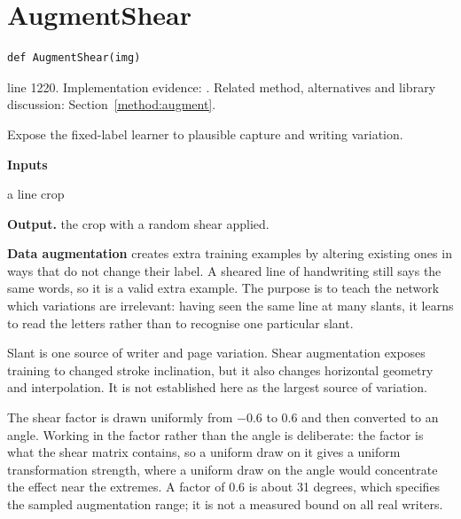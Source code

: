 \section{AugmentShear}\label{fn:train:AugmentShear}
\begin{lstlisting}[style=sig]
def AugmentShear(img)
\end{lstlisting}
 line 1220. Implementation evidence: \cite{code2026}. Related method, alternatives and library discussion: Section~\ref{method:augment}.


Expose the fixed-label learner to plausible capture and writing variation.




\noindent\textbf{Inputs}
\begin{description}[leftmargin=2.2em,style=nextline,font=\normalfont\ttfamily]\setlength\itemsep{1pt}
  \item[{img}] \normalfont a line crop
\end{description}

\noindent\textbf{Output.} the crop with a random shear applied.


\textbf{Data augmentation} creates extra training examples by altering existing ones in ways that do not change their label. A sheared line of handwriting still says the same words, so it is a valid extra example. The purpose is to teach the network which variations are irrelevant: having seen the same line at many slants, it learns to read the letters rather than to recognise one particular slant.


Slant is one source of writer and page variation. Shear augmentation exposes training to changed stroke inclination, but it also changes horizontal geometry and interpolation. It is not established here as the largest source of variation.


The shear factor is drawn uniformly from $-$0.6 to 0.6 and then converted to an angle. Working in the factor rather than the angle is deliberate: the factor is what the shear matrix contains, so a uniform draw on it gives a uniform transformation strength, where a uniform draw on the angle would concentrate the effect near the extremes. A factor of 0.6 is about 31 degrees, which specifies the sampled augmentation range; it is not a measured bound on all real writers.



